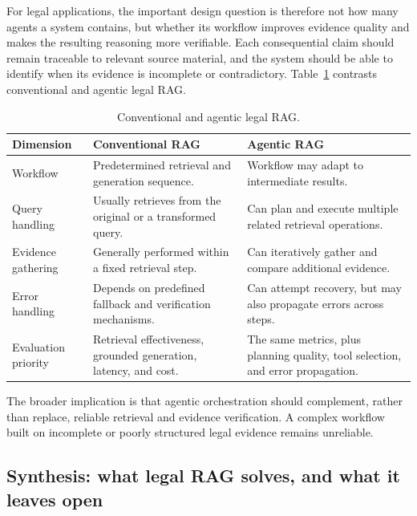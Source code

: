 For legal applications, the important design question is therefore not how many agents a system
contains, but whether its workflow improves evidence quality and makes the resulting reasoning more
verifiable. Each consequential claim should remain traceable to relevant source material, and the
system should be able to identify when its evidence is incomplete or contradictory.
Table~\ref{tab:agentic} contrasts conventional and agentic legal RAG.

\begin{table}[tp]
\centering
\caption{Conventional and agentic legal RAG.}
\label{tab:agentic}
\footnotesize
\setlength{\tabcolsep}{5pt}
\renewcommand{\arraystretch}{1.3}
\begin{tabularx}{\textwidth}{>{\raggedright\arraybackslash}p{2.8cm} >{\raggedright\arraybackslash}X >{\raggedright\arraybackslash}X}
\toprule
\textbf{Dimension} & \textbf{Conventional RAG} & \textbf{Agentic RAG} \\
\midrule
Workflow & Predetermined retrieval and generation sequence. & Workflow may adapt to intermediate results. \\
Query handling & Usually retrieves from the original or a transformed query. & Can plan and execute multiple related retrieval operations. \\
Evidence gathering & Generally performed within a fixed retrieval step. & Can iteratively gather and compare additional evidence. \\
Error handling & Depends on predefined fallback and verification mechanisms. & Can attempt recovery, but may also propagate errors across steps. \\
Evaluation priority & Retrieval effectiveness, grounded generation, latency, and cost. & The same metrics, plus planning quality, tool selection, and error propagation. \\
\bottomrule
\end{tabularx}
\end{table}

The broader implication is that agentic orchestration should complement, rather than replace,
reliable retrieval and evidence verification. A complex workflow built on incomplete or poorly
structured legal evidence remains unreliable.

\subsection{Synthesis: what legal RAG solves, and what it leaves open}

